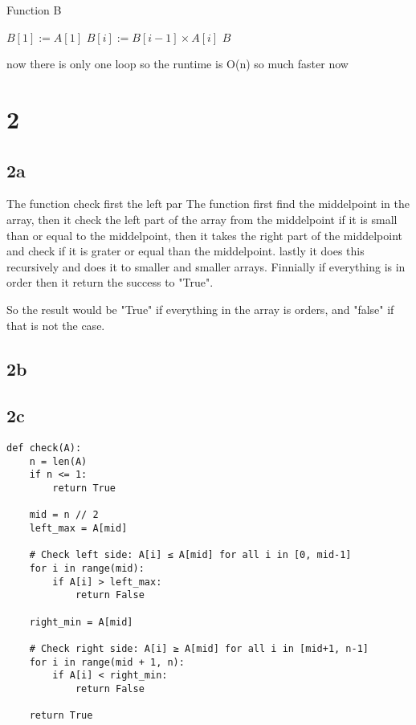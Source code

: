 \documentclass{article}
\begin{document}
\begin{algorithm}
\caption{Function B}
\begin{algorithmic}[1]
    \State $B[1] := A[1]$ 
     
        \State $B[i] := B[i - 1] \times A[i]$ 
    \EndFor
    \State \Return $B$
\EndProcedure
\end{algorithmic}
\end{algorithm}


now there is only one loop so the runtime is O(n) so much faster now

\section{2}

\subsection{2a}
The function check first the left par
The function first find the middelpoint in the array, then it check the left part of the array from the middelpoint if it is small than or equal to the middelpoint, then it takes the right part of the middelpoint and check if it is grater or equal than the middelpoint. lastly it does this recursively and does it to smaller and smaller arrays. Finnially if everything is in order then it return the success to "True".

So the result would be "True" if everything in the array is orders, and "false" if that is not the case.


\subsection{2b}



\subsection{2c}

\begin{verbatim}
def check(A):
    n = len(A)
    if n <= 1:
        return True

    mid = n // 2
    left_max = A[mid]
    
    # Check left side: A[i] ≤ A[mid] for all i in [0, mid-1]
    for i in range(mid):
        if A[i] > left_max:
            return False

    right_min = A[mid]

    # Check right side: A[i] ≥ A[mid] for all i in [mid+1, n-1]
    for i in range(mid + 1, n):
        if A[i] < right_min:
            return False

    return True

\end{verbatim}
\end{document}
